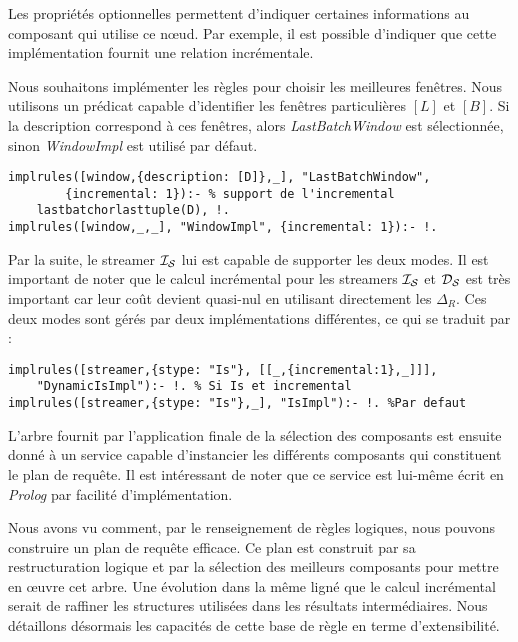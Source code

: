 Les propriétés optionnelles permettent d'indiquer certaines informations au composant qui utilise ce nœud. Par exemple, il est possible d'indiquer que cette implémentation fournit une relation incrémentale.
\begin{example}
	Nous souhaitons implémenter les règles pour choisir les meilleures fenêtres. Nous utilisons un prédicat capable d'identifier les fenêtres particulières $[L]$ et $[B]$. Si la description correspond à ces fenêtres, alors \textit{LastBatchWindow} est sélectionnée, sinon \textit{WindowImpl} est utilisé par défaut.
\begin{lstlisting}
implrules([window,{description: [D]},_], "LastBatchWindow", 
        {incremental: 1}):- % support de l'incremental
    lastbatchorlasttuple(D), !.
implrules([window,_,_], "WindowImpl", {incremental: 1}):- !.
\end{lstlisting}
\end{example}

\begin{example}
Par la suite, le streamer $\mathcal{I_S}$ lui est capable de supporter les deux modes. Il est important de noter que le calcul incrémental pour les streamers $\mathcal{I_S}$ et $\mathcal{D_S}$ est très important car leur coût devient quasi-nul en utilisant directement les $\Delta_R$. Ces deux modes sont gérés par deux implémentations différentes, ce qui se traduit par :
\begin{lstlisting}
implrules([streamer,{stype: "Is"}, [[_,{incremental:1},_]]], 
    "DynamicIsImpl"):- !. % Si Is et incremental
implrules([streamer,{stype: "Is"},_], "IsImpl"):- !. %Par defaut
\end{lstlisting}
\end{example}

L'arbre fournit par l'application finale de la sélection des composants est ensuite donné à un service capable d'instancier les différents composants qui constituent le plan de requête. Il est intéressant de noter que ce service est lui-même écrit en \textit{Prolog} par facilité d'implémentation.

Nous avons vu comment, par le renseignement de règles logiques, nous pouvons construire un plan de requête efficace. Ce plan est construit par sa restructuration logique et par la sélection des meilleurs composants pour mettre en œuvre cet arbre. Une évolution dans la même ligné que le calcul incrémental serait de raffiner les structures utilisées dans les résultats intermédiaires. Nous détaillons désormais les capacités de cette base de règle en terme d'extensibilité.